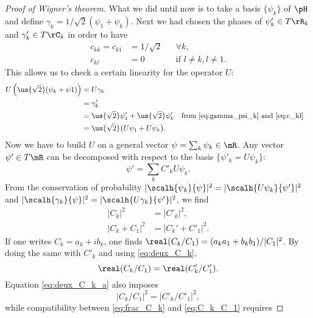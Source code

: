 \begin{proof}[Proof of Wigner's theorem]
What we  did until now is to take a basis $\{\psi_k\}$ of $\pH$ and define $\gamma_k=1/\sqrt2(\psi_1+\psi_k)$. Next we had chosen the phases of $\psi'_k\in T\rR_k$ and $\gamma'_k\in T\rC_k$ in order to have
\begin{equation}\label{eq:c_kl}
\begin{aligned}
   c_{kk}=c_{k1}&=1/\sqrt 2&&\forall k,\\
   c_{kl}&=0 &&\text{if }l\neq k,l\neq 1.
\end{aligned}   
\end{equation}
This allows us to check a certain linearity for the operator $U$:
\begin{equation}
\begin{aligned}
U\left( \us{\sqrt 2}(\psi_k+\psi1)  \right)
   &=U\gamma_k\\
   &=\gamma'_k\\
   &=\us{\sqrt 2}\psi'_1+\us{\sqrt 2}\psi'_k&&\text{from \eqref{eq:gamma_psi_k} and \eqref{eq:c_kl}}\\
   &=\us{\sqrt{2}}\big(  U\psi_1+U\psi_k   \big).
\end{aligned}
\end{equation}
Now we have to build $U$ on a general vector $\psi=\sum_k\psi_k\in\mR$. Any vector $\psi'\in T\mR$ can be decomposed with respect to the basis $\{\psi'_k=U\psi_k\}$: 
\begin{equation}\label{eq:dev_Upsi}
  \psi'=\sum_k C'_kU\psi_k.
\end{equation}
From the conservation of probability $|\scalh{\psi_k}{\psi}|^2=|\scalh{U\psi_k}{\psi'}|^2$ and $|\scalh{\gamma_k}{\psi}|^2=|\scalh{U\gamma_k}{\psi'}|^2$, we find
\begin{subequations}\label{eq:deux_C_k}
\begin{align}
          |C_k|^2&=|C'_k|^2, \label{eq:deux_C_k_a} \\
       |C_k+C_1|^2&=|C_k'+C'_1|^2.
\end{align}
\end{subequations}
If one writes $C_k=a_k+ib_k$, one finds $\real(C_k/C_1)=(a_ka_1+b_kb_1)/|C_1|^2$. By doing the same with $C'_k$ and using \eqref{eq:deux_C_k},
\begin{equation}\label{eq:C_k_C_1}
  \real(C_k/C_1)=\real(C'_k/C'_1).
\end{equation}
Equation \eqref{eq:deux_C_k_a} also imposes
\begin{equation}\label{eq:frac_C_k}
 |C_k/C_1|^2=|C'_k/C'_1|^2,
\end{equation}
while compatibility between \eqref{eq:frac_C_k} and \eqref{eq:C_k_C_1} requires

\end{proof}

